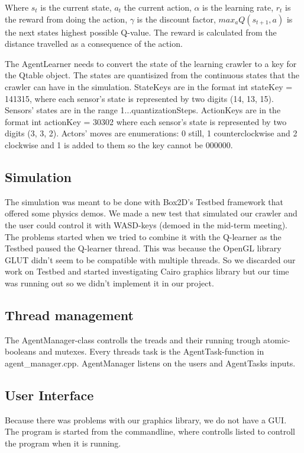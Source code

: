 \documentclass{article}
\begin{document}
Where $s_t$ is the current state, $a_t$ the current action,
$\alpha$ is the learning rate, $r_t$ is the reward from doing the action,
$\gamma$ is the discount factor, $max_aQ(s_{t+1}, a)$ is the next states
highest possible Q-value. The reward is calculated from the distance travelled
as a consequence of the action.


The AgentLearner needs to convert the state of the learning crawler to a key
for the Qtable object. The states are quantisized from the continuous states
that the crawler can have in the simulation. StateKeys are in the format
int stateKey = 141315, where each sensor's
state is represented by two digits (14, 13, 15). Sensors' states are
in the range 1...quantizationSteps. ActionKeys are in the format
int actionKey = 30302 where each sensor's
state is represented by two digits (3, 3, 2). Actors' moves are
enumerations: 0 still, 1 counterclockwise and 2 clockwise and 1 is
added to them so the key cannot be 000000.

\subsection{Simulation}
The simulation was meant to be done with Box2D's Testbed framework that 
offered some physics demos. We made a new test that simulated our crawler
and the user could control it with WASD-keys (demoed in the mid-term meeting).
The problems started when we tried to combine it with the Q-learner as the
Testbed paused the Q-learner thread. This was because the OpenGL library GLUT
didn't seem to be compatible with multiple threads. So we discarded our work on
Testbed and started investigating Cairo graphics library but our time was running out
so we didn't implement it in our project. 

\subsection{Thread management}
The AgentManager-class controlls the treads and their running trough
atomic-booleans and mutexes. Every threads task is the AgentTask-function
in agent\_manager.cpp. AgentManager listens on the users and AgentTasks
inputs.

\subsection{User Interface}
Because there was problems with our graphics library, we do not have a GUI.
The program is started from the commandline, where controlls listed
to controll the program when it is running.
\end{document}
